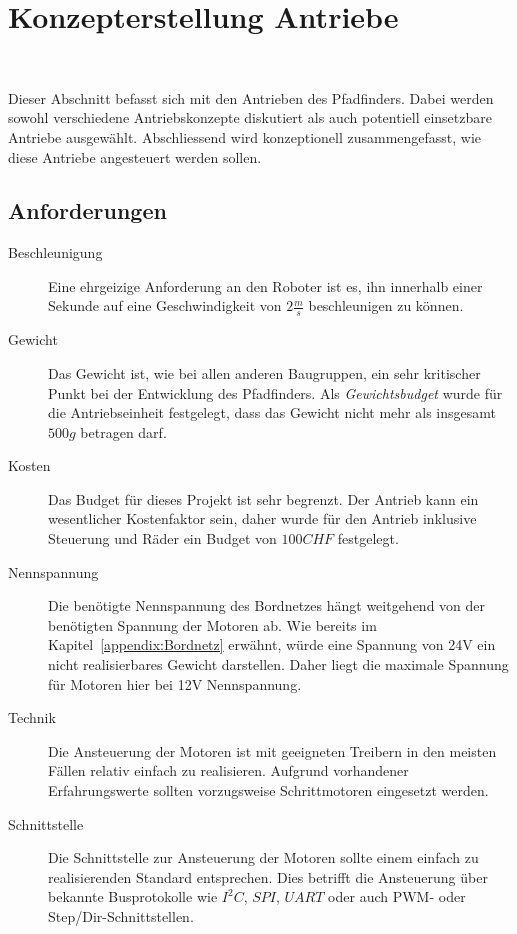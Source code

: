 \documentclass[main.  tex]{subfiles} %
\begin{document}
\section{Konzepterstellung Antriebe}~\label{appendix:Antriebe}

Dieser Abschnitt befasst sich mit den Antrieben des Pfadfinders. Dabei werden
sowohl verschiedene Antriebskonzepte diskutiert als auch potentiell einsetzbare
Antriebe ausgewählt. Abschliessend wird konzeptionell zusammengefasst, wie
diese Antriebe angesteuert werden sollen.
\subsection*{Anforderungen}

\begin{description}
    \item[Beschleunigung] Eine ehrgeizige Anforderung an den Roboter ist es, ihn
          innerhalb einer Sekunde auf eine Geschwindigkeit von $2 \frac{m}{s} $
          beschleunigen zu können.
    \item[Gewicht] Das Gewicht ist, wie bei allen anderen Baugruppen, ein sehr kritischer
          Punkt bei der Entwicklung des Pfadfinders. Als \textit{Gewichtsbudget} wurde
          für die Antriebseinheit festgelegt, dass das Gewicht nicht mehr als insgesamt
          $500 g$ betragen darf.
    \item[Kosten] Das Budget für dieses Projekt ist sehr begrenzt. Der Antrieb kann ein
          wesentlicher Kostenfaktor sein, daher wurde für den Antrieb inklusive Steuerung
          und Räder ein Budget von $100 CHF$ festgelegt.
    \item[Nennspannung] Die benötigte Nennspannung des Bordnetzes hängt weitgehend von
          der benötigten Spannung der Motoren ab. Wie bereits im
          Kapitel~\ref{appendix:Bordnetz} erwähnt, würde eine Spannung von 24V ein nicht
          realisierbares Gewicht darstellen. Daher liegt die maximale Spannung für
          Motoren hier bei 12V Nennspannung.
    \item[Technik] Die Ansteuerung der Motoren ist mit geeigneten Treibern in den meisten
          Fällen relativ einfach zu realisieren. Aufgrund vorhandener Erfahrungswerte
          sollten vorzugsweise Schrittmotoren eingesetzt werden.
    \item[Schnittstelle] Die Schnittstelle zur Ansteuerung der Motoren sollte einem
          einfach zu realisierenden Standard entsprechen. Dies betrifft die Ansteuerung
          über bekannte Busprotokolle wie $I^2C$, $SPI$, $UART$ oder auch PWM- oder
          Step/Dir-Schnittstellen.

\end{description}
\end{document}
